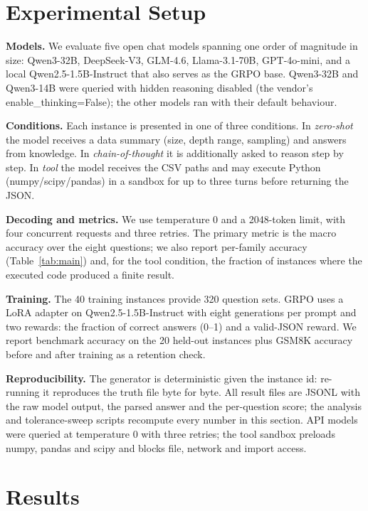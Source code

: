 \documentclass[10pt]{article}
\begin{document}
\section{Experimental Setup}
\label{sec:setup}
\textbf{Models.} We evaluate five open chat models spanning one order of
magnitude in size: Qwen3-32B, DeepSeek-V3, GLM-4.6, Llama-3.1-70B, GPT-4o-mini, and a local
Qwen2.5-1.5B-Instruct that also serves as the GRPO base. Qwen3-32B and
Qwen3-14B were queried with hidden reasoning disabled (the vendor's enable\_thinking=False);
the other models ran with their default behaviour.

\textbf{Conditions.} Each instance is presented in one of three conditions. In
\emph{zero-shot} the model receives a data summary (size, depth range, sampling) and answers
from knowledge. In \emph{chain-of-thought} it is additionally asked to reason step by step.
In \emph{tool} the model receives the CSV paths and may execute Python (numpy/scipy/pandas)
in a sandbox for up to three turns before returning the JSON.

\textbf{Decoding and metrics.} We use temperature 0 and a 2048-token limit, with four
concurrent requests and three retries. The primary metric is the macro accuracy over the
eight questions; we also report per-family accuracy (Table~\ref{tab:main}) and, for the tool
condition, the fraction of instances where the executed code produced a finite result.

\textbf{Training.} The 40 training instances provide 320 question sets. GRPO uses a LoRA
adapter on Qwen2.5-1.5B-Instruct with eight generations per prompt and two rewards: the
fraction of correct answers (0--1) and a valid-JSON reward. We report benchmark accuracy on
the 20 held-out instances plus GSM8K accuracy before and after training as a retention check.

\textbf{Reproducibility.} The generator is deterministic given the instance id: re-running
it reproduces the truth file byte for byte. All result files are JSONL with the raw model
output, the parsed answer and the per-question score; the analysis and tolerance-sweep scripts
recompute every number in this section. API models were queried at temperature 0 with three
retries; the tool sandbox preloads numpy, pandas and scipy and blocks file, network and import
access.

\section{Results}
\label{sec:results}
\end{document}
